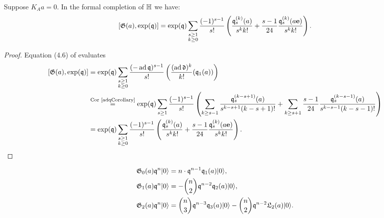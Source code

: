 \begin{proposition}
Suppose $K_Aa=0$.
In the formal completion of $\mathbb{H}$ we have:
$$
\left[ \mathfrak{G}(a),\exp(\mathfrak{q})\right] =
\exp(\mathfrak{q}) \sum_{\substack{s\geq 1\\k\geq 0}}\frac{(-1)^{s-1}}{s!}\left(\frac{\mathfrak{q}_s^{(k)}(a)}{s^{k}k!} + \frac{s-1}{24}\frac{\mathfrak{q}_s^{(k)}(a\mathbf e)}{s^{k}k!}\right).
$$
\end{proposition}
\begin{proof}
Equation (4.6) of \cite{LehnSorger} evaluates 
\begin{align*}
\left[ \mathfrak{G}(a),\exp(\mathfrak{q})\right] &= \exp(\mathfrak{q}) \sum_{\substack{s\geq 1\\k\geq 0}} \frac{(-\operatorname{ad} \mathfrak{q})^{s-1}}{s!}\left(\frac{(\operatorname{ad} \mathfrak d)^k}{k!} (\mathfrak{q}_1(a)) \right) \\
 &\stackrel{\text{Cor \ref{adqCorollary}}}{=} \exp(\mathfrak{q})  \sum_{s\geq 1}\frac{(-1)^{s-1}}{s!}\left(\sum_{k\geq s-1}\frac{\mathfrak{q}_s^{(k-s+1)}(a)}{s^{k-s+1}(k-s+1)!}
  + \sum_{k\geq s+1}\frac{s-1}{24}\frac{\mathfrak{q}_s^{(k-s-1)}(a)}{s^{k-s-1}(k-s-1)!} \right)\\
  &=\exp(\mathfrak{q}) \sum_{\substack{s\geq 1\\k\geq 0}}\frac{(-1)^{s-1}}{s!}\left(\frac{\mathfrak{q}_s^{(k)}(a)}{s^{k}k!} + \frac{s-1}{24}\frac{\mathfrak{q}_s^{(k)}(a\mathbf e)}{s^{k}k!}\right).
\end{align*}
\end{proof}
\begin{example} 
\begin{align}
 \mathfrak{G}_0(a)\mathfrak{q}^n|0\rangle & = n\cdot \mathfrak{q}^{n-1}\mathfrak{q}_1(a)|0\rangle, \\
 \mathfrak{G}_1(a)\mathfrak{q}^n|0\rangle & = -\binom{n}{2} \mathfrak{q}^{n-2}\mathfrak{q}_2(a)|0\rangle, \\
 \mathfrak{G}_2(a)\mathfrak{q}^n|0\rangle & = \binom{n}{3} \mathfrak{q}^{n-3}\mathfrak{q}_3(a)|0\rangle - \binom{n}{2} \mathfrak{q}^{n-2}\mathfrak{L}_2(a)|0\rangle.
\end{align}
\end{example}

